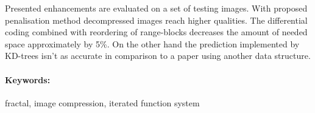 {Presented enhancements are evaluated on a set of testing images. With proposed penalisation method decompressed images reach higher qualities. The differential coding combined with reordering of range-blocks decreases the amount of needed space approximately by 5\%. On the other hand the prediction implemented by KD-trees isn't as accurate in comparison to a paper using another data structure.

\paragraph{Keywords:} fractal, image compression, iterated function system

\vspace{10mm}
}
\cleardoublepage %
\endinput
